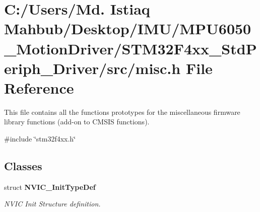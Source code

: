 \section{C\+:/\+Users/\+Md. Istiaq Mahbub/\+Desktop/\+I\+M\+U/\+M\+P\+U6050\+\_\+\+Motion\+Driver/\+S\+T\+M32\+F4xx\+\_\+\+Std\+Periph\+\_\+\+Driver/src/misc.h File Reference}
\label{misc_8h}


This file contains all the functions prototypes for the miscellaneous firmware library functions (add-\/on to C\+M\+S\+IS functions).  


{\ttfamily \#include \char`\"{}stm32f4xx.\+h\char`\"{}}\newline
\subsection*{Classes}
\begin{DoxyCompactItemize}
\item 
struct \textbf{ N\+V\+I\+C\+\_\+\+Init\+Type\+Def}
\begin{DoxyCompactList}\small\item\em N\+V\+IC Init Structure definition. \end{DoxyCompactList}\end{DoxyCompactItemize}
